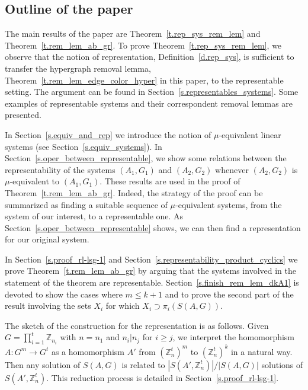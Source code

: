 \documentclass[10pt]{article}
\newcommand{\Z}{\mathbb Z}
\begin{document}
\subsection{Outline of the paper}

The main results of the paper are Theorem~\ref{t.rep_sys_rem_lem} and Theorem~\ref{t.rem_lem_ab_gr}. To prove Theorem~\ref{t.rep_sys_rem_lem}, we observe that the notion of representation, Definition~\ref{d.rep_sys}, is sufficient to transfer the hypergraph removal lemma, Theorem~\ref{t.rem_lem_edge_color_hyper} in this paper, to the representable setting. The argument can be found in Section~\ref{s.representables_systems}.
Some examples of representable systems and their correspondent removal lemmas are presented.



In Section~\ref{s.equiv_and_rep} we introduce the notion of $\mu$-equivalent linear systems (see Section~\ref{s.equiv_systems}). In Section~\ref{s.oper_between_representable}, we show some relations between the representability of the systems $(A_1,G_1)$ and $(A_2,G_2)$ whenever $(A_2,G_2)$ is $\mu$-equivalent to $(A_1,G_1)$. These results are used in the proof of Theorem~\ref{t.rem_lem_ab_gr}. Indeed, the strategy of the proof can be summarized as finding a suitable sequence of $\mu$-equivalent systems, from the system of our interest, to a representable one. As Section~\ref{s.oper_between_representable} shows, we can then find a representation for our original system.



In Section~\ref{s.proof_rl-lsg-1} and Section~\ref{s.representability_product_cyclics} we prove Theorem~\ref{t.rem_lem_ab_gr} by arguing that the systems involved in the statement of the theorem are representable. 
Section~\ref{s.finish_rem_lem_dkA1} is devoted to show the cases where $m\leq k+1$ and to prove the second part of the result 
involving the sets $X_i$ for which $X_i\supset\pi_i(S(A,G))$.


The sketch of the construction for the representation is as follows.
Given $G=\prod_{i=1}^t \Z_{n_i}$ with $n=n_1$ and $n_i|n_j$ for $i\geq j$, we interpret the homomorphism $A:G^m\to G^t$ as a homomorphism $A'$ from  $(\Z_{n}^t)^m$ to $(\Z_{n}^t)^k$ 
in a natural way. Then any solution of $S(A,G)$ is related to $|S(A',\Z_{n}^t)|/|S(A,G)|$ solutions of $S(A',\Z_{n}^t)$. This reduction process is detailed in Section~\ref{s.proof_rl-lsg-1}.
\end{document}
